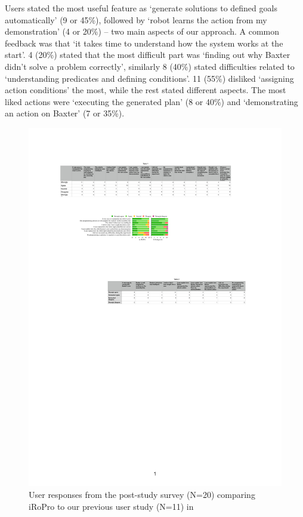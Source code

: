 Users stated the most useful feature as `generate solutions to defined goals automatically' (9 or 45\%), followed by `robot learns the action from my demonstration' (4 or 20\%) -- two main aspects of our approach.
A common feedback was that `it takes time to understand how the system works at the start'.
4 (20\%) stated that the most difficult part was `finding out why Baxter didn't solve a problem correctly', similarly 8 (40\%) stated difficulties related to `understanding predicates and defining conditions'. 
11 (55\%) disliked `assigning action conditions' the most, while the rest stated different aspects.
The most liked actions were `executing the generated plan' (8 or 40\%) and `demonstrating an action on Baxter' (7 or 35\%).

\begin{figure}
	\includegraphics[width=0.98\linewidth]{figures/quan-exp1vsexp2-results.pdf}
	\caption{User responses from the post-study survey (N=20) comparing iRoPro to our previous user study (N=11) in }
	\label{fig:exp1vsexp2-results}
\end{figure}

